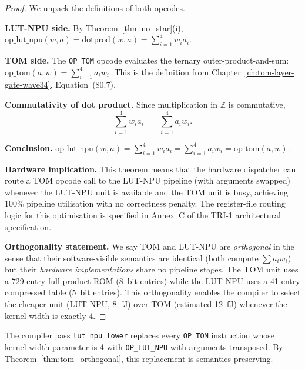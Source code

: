 \begin{proof}
We unpack the definitions of both opcodes.

\medskip
\noindent\textbf{LUT-NPU side.}
By Theorem~\ref{thm:no_star}(i),
\(\mathrm{op\_lut\_npu}(w,a) = \mathrm{dotprod}(w,a) = \sum_{i=1}^4 w_i a_i\).

\medskip
\noindent\textbf{TOM side.}
The \texttt{OP\_TOM} opcode evaluates the ternary outer-product-and-sum:
\(\mathrm{op\_tom}(a,w) = \sum_{i=1}^4 a_i w_i\).
This is the definition from Chapter~\ref{ch:tom-layer-gate-wave34},
Equation~(80.7).

\medskip
\noindent\textbf{Commutativity of dot product.}
Since multiplication in \(\mathbb{Z}\) is commutative,
\[
  \sum_{i=1}^4 w_i a_i \;=\; \sum_{i=1}^4 a_i w_i.
\]

\medskip
\noindent\textbf{Conclusion.}
\(\mathrm{op\_lut\_npu}(w,a) = \sum_{i=1}^4 w_i a_i
= \sum_{i=1}^4 a_i w_i = \mathrm{op\_tom}(a,w)\).

\medskip
\noindent\textbf{Hardware implication.}
This theorem means that the hardware dispatcher can route a TOM opcode
call to the LUT-NPU pipeline (with arguments swapped) whenever the
LUT-NPU unit is available and the TOM unit is busy, achieving 100\%
pipeline utilisation with no correctness penalty.  The register-file
routing logic for this optimisation is specified in
Annex~C of the TRI-1 architectural specification.

\medskip
\noindent\textbf{Orthogonality statement.}
We say TOM and LUT-NPU are \emph{orthogonal} in the sense that their
software-visible semantics are identical (both compute
\(\sum a_i w_i\)) but their \emph{hardware implementations} share no
pipeline stages.  The TOM unit uses a 729-entry full-product ROM
(8~bit entries) while the LUT-NPU uses a 41-entry compressed table
(5~bit entries).  This orthogonality enables the compiler to select
the cheaper unit (LUT-NPU, 8~fJ) over TOM (estimated 12~fJ) whenever
the kernel width is exactly 4.
\end{proof}

\begin{corollary}
\label{cor:dispatch}
The compiler pass \texttt{lut\_npu\_lower} replaces every \texttt{OP\_TOM}
instruction whose kernel-width parameter is 4 with \texttt{OP\_LUT\_NPU}
with arguments transposed.  By Theorem~\ref{thm:tom_orthogonal}, this
replacement is semantics-preserving.
\end{corollary}

